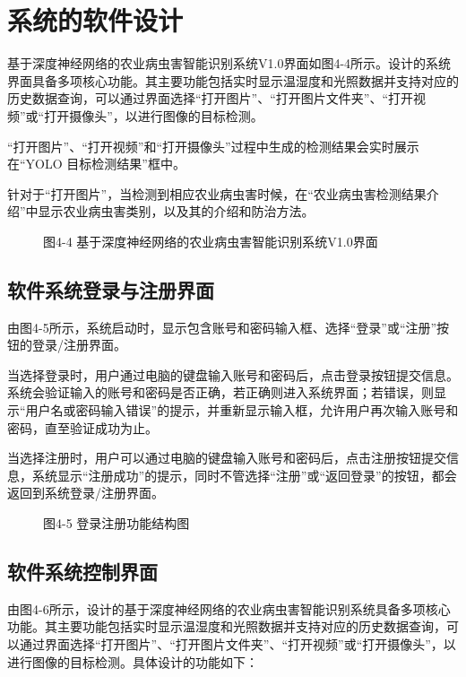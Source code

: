 \documentclass[12pt, a4paper, twoside]{ctexart}
\begin{document}
\section{系统的软件设计}

基于深度神经网络的农业病虫害智能识别系统V1.0界面如图4-4所示。设计的系统界面具备多项核心功能。其主要功能包括实时显示温湿度和光照数据并支持对应的历史数据查询，可以通过界面选择“打开图片”、“打开图片文件夹”、“打开视频”或“打开摄像头”，以进行图像的目标检测。

“打开图片”、“打开视频”和“打开摄像头”过程中生成的检测结果会实时展示在“YOLO 目标检测结果”框中。

针对于“打开图片”，当检测到相应农业病虫害时候，在“农业病虫害检测结果介绍”中显示农业病虫害类别，以及其的介绍和防治方法。


\begin{figure}[htbp]
\centering
\caption{图4-4 基于深度神经网络的农业病虫害智能识别系统V1.0界面}
\end{figure}


\subsection{软件系统登录与注册界面}

由图4-5所示，系统启动时，显示包含账号和密码输入框、选择“登录”或“注册”按钮的登录/注册界面。

当选择登录时，用户通过电脑的键盘输入账号和密码后，点击登录按钮提交信息。系统会验证输入的账号和密码是否正确，若正确则进入系统界面；若错误，则显示“用户名或密码输入错误”的提示，并重新显示输入框，允许用户再次输入账号和密码，直至验证成功为止。

当选择注册时，用户可以通过电脑的键盘输入账号和密码后，点击注册按钮提交信息，系统显示“注册成功”的提示，同时不管选择“注册”或“返回登录”的按钮，都会返回到系统登录/注册界面。


\begin{figure}[htbp]
\centering
\caption{图4-5 登录注册功能结构图}
\end{figure}


\subsection{软件系统控制界面}

由图4-6所示，设计的基于深度神经网络的农业病虫害智能识别系统具备多项核心功能。其主要功能包括实时显示温湿度和光照数据并支持对应的历史数据查询，可以通过界面选择“打开图片”、“打开图片文件夹”、“打开视频”或“打开摄像头”，以进行图像的目标检测。具体设计的功能如下：
\end{document}
